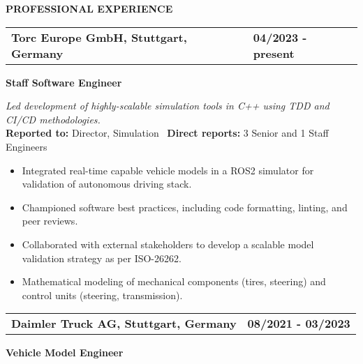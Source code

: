 \documentclass[a4paper,10pt]{article}
\begin{document}
\vspace{0.1cm}
\noindent{\rule{\linewidth}{1.4pt}}
\textbf{PROFESSIONAL EXPERIENCE}

\vspace{-0.1cm}
\noindent{\rule{\linewidth}{0.01cm}}

\noindent
\begin{tabular}{ @{\hskip 0pt}m{} >{\raggedleft\arraybackslash}p{} }
    \noindent\textbf{Torc Europe GmbH, Stuttgart, Germany} & \textbf{04/2023 - present}
\end{tabular}

\noindent
\colorbox{gray!40}{%
    \parbox{0.99\textwidth}{%
        \textcolor{highlightcolor}{\textbf{Staff Software Engineer}}
    }%
}

\vspace{0.2cm}
\noindent
\textit{Led development of highly-scalable simulation tools in C++ using TDD and CI/CD methodologies. }\\

\vspace{-0.3cm}
\noindent
\textbf{Reported to:} Director, Simulation \, \textbf{Direct reports:} 3 Senior and 1 Staff Engineers \, 
\begin{itemize}[itemsep=0pt, topsep=5pt]
  \item Integrated real-time capable vehicle models in a ROS2
      simulator for validation of autonomous driving stack.
  \item Championed software best practices, including code formatting, linting, and peer reviews.
  \item Collaborated with external stakeholders to develop a scalable model
      validation strategy as per ISO-26262.
  \item Mathematical modeling of mechanical components (tires, steering) and control units (steering, transmission). 
\end{itemize}

\vspace{0.3cm}
\noindent
\begin{tabular}{ @{\hskip 0pt}m{} >{\raggedleft\arraybackslash}p{} }
    \noindent\textbf{Daimler Truck AG, Stuttgart, Germany} & \textbf{08/2021 - 03/2023}
\end{tabular}

\noindent
\colorbox{gray!40}{%
    \parbox{0.99\textwidth}{%
        \textcolor{highlightcolor}{\textbf{Vehicle Model Engineer}}
    }%
}
\end{document}
